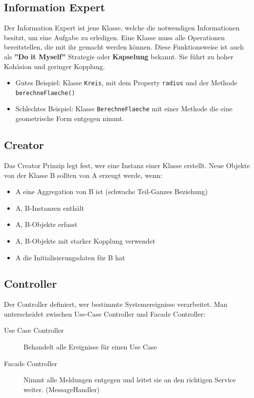 \subsection{Information Expert}
Der Information Expert ist jene Klasse, welche die notwendigen Informationen besitzt, um eine Aufgabe zu erledigen. Eine Klasse muss alle Operationen bereitstellen, die mit ihr gemacht werden können. Diese Funktionsweise ist auch als \textbf{''Do it Myself''} Strategie oder \textbf{Kapselung} bekannt. Sie führt zu hoher Kohäsion und geringer Kopplung. 

\begin{itemize}
	\item Gutes Beispiel: Klasse \lstinline|Kreis|, mit dem Property \lstinline|radius| und der Methode \lstinline|berechneFlaeche()|
	\item Schlechtes Beispiel: Klasse \lstinline|BerechneFlaeche| mit einer Methode die eine geometrische Form entgegen nimmt.
\end{itemize}

\subsection{Creator}
Das Creator Prinzip legt fest, wer eine Instanz einer Klasse erstellt. Neue Objekte von der Klasse B sollten von A erzeugt werde, wenn:
\begin{itemize}
	\item A eine Aggregation von B ist (schwache Teil-Ganzes Beziehung)
	\item A, B-Instanzen enthält
	\item A, B-Objekte erfasst
	\item A, B-Objekte mit starker Kopplung
	 verwendet
	\item A die Initialisierungsdaten für B hat
\end{itemize}

\subsection{Controller}
Der Controller definiert, wer bestimmte Systemereignisse verarbeitet. Man unterscheidet zwischen Use-Case Controller und Facade Controller:
\begin{description}
	\item[Use Case Controller] Behandelt alle Ereignisse für einen Use Case
	\item[Facade Controller] Nimmt alle Meldungen entgegen und leitet sie an den richtigen Service weiter. (MessageHandler)
\end{description}

